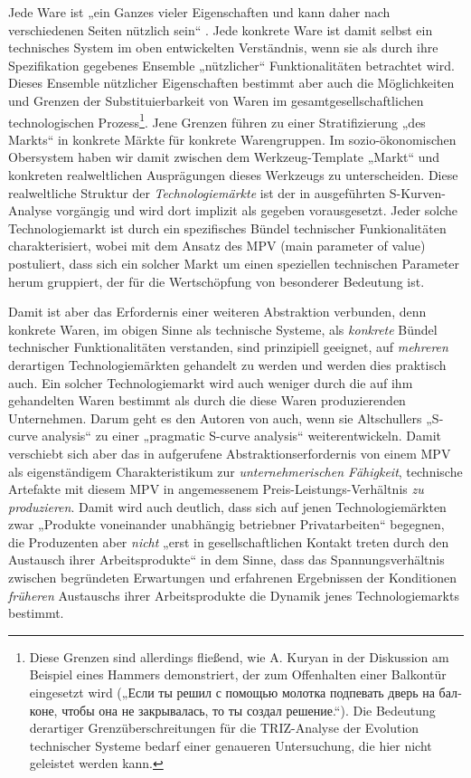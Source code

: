 \documentclass[11pt,a4paper]{article}
\begin{document}
Jede Ware ist „ein Ganzes vieler Eigenschaften und kann daher nach
verschiedenen Seiten nützlich sein“ \cite[S. 49]{MEW23}. Jede konkrete Ware
ist damit selbst ein technisches System im oben entwickelten Verständnis, wenn
sie als durch ihre Spezifikation gegebenes Ensemble „nützlicher“
Funktionalitäten betrachtet wird. Dieses Ensemble nützlicher Eigenschaften
bestimmt aber auch die Möglichkeiten und Grenzen der Substituierbarkeit von
Waren im gesamtgesellschaftlichen technologischen Prozess\footnote{Diese
  Grenzen sind allerdings fließend, wie A. Kuryan in der Diskussion
  \cite{Graebe2019b} am Beispiel eines Hammers demonstriert, der zum
  Offenhalten einer Balkontür eingesetzt wird (\foreignlanguage{russian}{„Если
    ты решил с помощью молотка подпевать дверь на балконе, чтобы она не
    закрывалась, то ты создал решение.“}). Die Bedeutung derartiger
  Grenzüberschreitungen für die TRIZ-Analyse der Evolution technischer Systeme
  bedarf einer genaueren Untersuchung, die hier nicht geleistet werden kann.}.
Jene Grenzen führen zu einer Stratifizierung „des Markts“ in konkrete Märkte
für konkrete Warengruppen. Im sozio-ökonomischen Obersystem haben wir damit
zwischen dem Werkzeug-Template „Markt“ und konkreten realweltlichen
Ausprägungen dieses Werkzeugs zu unterscheiden. Diese realweltliche Struktur
der \emph{Technologiemärkte} ist der in \cite{TESE2018} ausgeführten
S-Kurven-Analyse vorgängig und wird dort implizit als gegeben vorausgesetzt.
Jeder solche Technologiemarkt ist durch ein spezifisches Bündel technischer
Funkionalitäten charakterisiert, wobei \cite{TESE2018} mit dem Ansatz des MPV
(main parameter of value) postuliert, dass sich ein solcher Markt um einen
speziellen technischen Parameter herum gruppiert, der für die Wertschöpfung
von besonderer Bedeutung ist.

Damit ist aber das Erfordernis einer weiteren Abstraktion verbunden, denn
konkrete Waren, im obigen Sinne als technische Systeme, als \emph{konkrete}
Bündel technischer Funktionalitäten verstanden, sind prinzipiell geeignet, auf
\emph{mehreren} derartigen Technologiemärkten gehandelt zu werden und werden
dies praktisch auch. Ein solcher Technologiemarkt wird auch weniger durch die
auf ihm gehandelten Waren bestimmt als durch die diese Waren produzierenden
Unternehmen. Darum geht es den Autoren von \cite{TESE2018} auch, wenn sie
Altschullers „S-curve analysis“ zu einer „pragmatic S-curve analysis“
weiterentwickeln.  Damit verschiebt sich aber das in \cite{TESE2018}
aufgerufene Abstraktionserfordernis von einem MPV als eigenständigem
Charakteristikum zur \emph{unternehmerischen Fähigkeit}, technische Artefakte
mit diesem MPV in angemessenem Preis-Leistungs-Verhältnis \emph{zu
  produzieren}.  Damit wird auch deutlich, dass sich auf jenen
Technologiemärkten zwar „Produkte voneinander unabhängig betriebner
Privatarbeiten“ begegnen, die Produzenten aber \emph{nicht} „erst in
gesellschaftlichen Kontakt treten durch den Austausch ihrer Arbeitsprodukte“
\cite[S. 87]{MEW23} in dem Sinne, dass das Spannungsverhältnis zwischen
begründeten Erwartungen und erfahrenen Ergebnissen der Konditionen
\emph{früheren} Austauschs ihrer Arbeitsprodukte die Dynamik jenes
Technologiemarkts bestimmt.  
\end{document}
